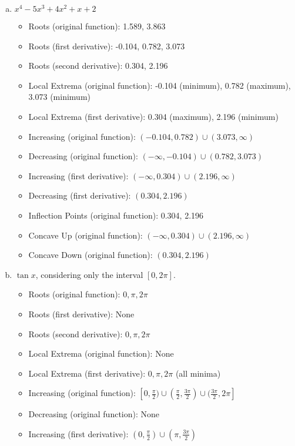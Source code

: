 \documentclass[11pt]{article}
\theoremstyle{definition}
\theoremstyle{remark}
\begin{document}
\begin{enumerate}[(a)]
\item $ \displaystyle x^4-5x^3+4x^2+x+2$
{\color{red} \begin{itemize}
    \item Roots (original function): 1.589, 3.863
    \item Roots (first derivative): -0.104, 0.782, 3.073
    \item Roots (second derivative): 0.304, 2.196
    \item Local Extrema (original function): -0.104 (minimum), 0.782 (maximum), 3.073 (minimum)
    \item Local Extrema (first derivative): 0.304 (maximum), 2.196 (minimum)
    \item Increasing (original function): $(-0.104, 0.782) \cup (3.073, \infty)$
    \item Decreasing (original function): $(-\infty, -0.104) \cup (0.782, 3.073)$
    \item Increasing (first derivative): $(-\infty, 0.304) \cup (2.196, \infty)$
    \item Decreasing (first derivative): $(0.304, 2.196)$
    \item Inflection Points (original function): 0.304, 2.196
    \item Concave Up (original function): $(-\infty, 0.304) \cup (2.196, \infty)$
    \item Concave Down (original function): $(0.304, 2.196)$
\end{itemize}}
\item $ \displaystyle \tan x$, considering only the interval $[0,2\pi]$.
{\color{red} \begin{itemize}
    \item Roots (original function): $0, \pi, 2\pi$
    \item Roots (first derivative): None
    \item Roots (second derivative): $0, \pi, 2\pi$
    \item Local Extrema (original function): None
    \item Local Extrema (first derivative): $0, \pi, 2\pi$ (all minima)
    \item Increasing (original function): $[0, \frac{\pi}{2}) \cup (\frac{\pi}{2}, \frac{3\pi}{2}) \cup (\frac{3\pi}{2}, 2\pi]$
    \item Decreasing (original function): None
    \item Increasing (first derivative): $(0, \frac{\pi}{2}) \cup (\pi, \frac{3\pi}{2})$

\end{itemize}}
\end{enumerate}
\end{document}
